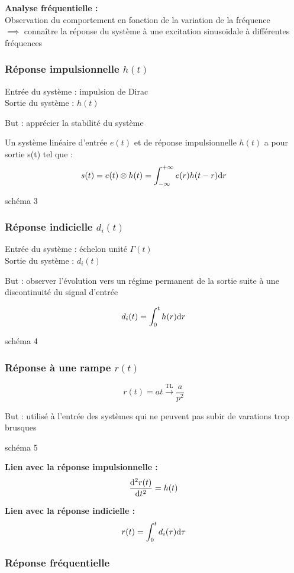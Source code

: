 \documentclass[a4paper,12pt]{report}
\begin{document}
\textbf{Analyse fréquentielle :} \\
Observation du comportement en fonction de la variation de la fréquence \\
$\implies$ connaître la réponse du système à une excitation sinusoïdale à différentes fréquences

\subsubsection{Réponse impulsionnelle $h(t)$}

Entrée du système : impulsion de Dirac \\
Sortie du système : $h(t)$

But : apprécier la stabilité du système

Un système linéaire d'entrée $e(t)$ et de réponse impulsionnelle $h(t)$ a pour sortie s(t) tel que :
\[ s(t) = e(t) \otimes h(t) = \int_{-\infty}^{+\infty} e(r) h(t - r) \mathrm{d}r\]

{\Large schéma 3}

\subsubsection{Réponse indicielle $d_i(t)$}

Entrée du système : échelon unité $\Gamma (t)$ \\
Sortie du système : $d_i(t)$

But : observer l'évolution vers un régime permanent de la sortie suite à une discontinuité du signal d'entrée

\[ d_i(t) = \int_0^t h(r) \mathrm{d}r \]

{\Large schéma 4}

\subsubsection{Réponse à une rampe $r(t)$}

\[ r(t) = at \xrightarrow{\mathrm{TL}} \dfrac{a}{p^2} \]

But : utilisé à l'entrée des systèmes qui ne peuvent pas subir de varations trop brusques

{\Large schéma 5}

\textbf{Lien avec la réponse impulsionnelle :}
\[ \dfrac{\mathrm{d}^2 r(t)}{\mathrm{d}t^2} = h(t) \]

\textbf{Lien avec la réponse indicielle :}
\[ r(t) = \int_0^t d_i(\tau) \mathrm{d}\tau \]

\subsubsection{Réponse fréquentielle}
\end{document}
